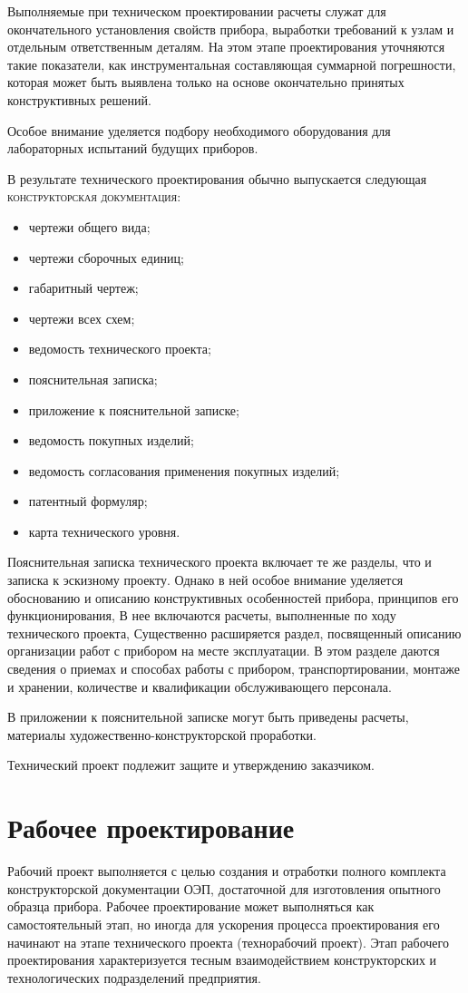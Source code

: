 Выполняемые при техническом проектировании расчеты служат для окончательного установления свойств прибора, выработки требований к узлам и отдельным ответственным деталям. На этом этапе проектирования уточняются такие показатели, как инструментальная составляющая суммарной погрешности, которая может быть выявлена только на основе окончательно принятых конструктивных решений. 

Особое внимание уделяется подбору необходимого оборудования для лабораторных испытаний будущих приборов.

В результате технического проектирования обычно выпускается следующая \textsc{конструкторская документация}: 
\begin{itemize}
	\item чертежи общего вида;
	\item чертежи сборочных единиц;
	\item габаритный чертеж;
	\item чертежи всех схем;
	\item ведомость технического проекта;
	\item пояснительная записка;
	\item приложение к пояснительной записке;
	\item ведомость покупных изделий;
	\item ведомость согласования применения покупных изделий;
	\item патентный формуляр;
	\item карта технического уровня.
\end{itemize}

Пояснительная записка технического проекта включает те же разделы, что и записка к эскизному проекту. Однако в ней особое внимание уделяется обоснованию и описанию конструктивных особенностей прибора, принципов его функционирования, В нее включаются расчеты, выполненные по ходу технического проекта, Существенно расширяется раздел, посвященный описанию организации работ с прибором на месте эксплуатации. В этом разделе даются сведения о приемах и способах работы с прибором, транспортировании, монтаже и хранении, количестве и квалификации обслуживающего персонала.

В приложении к пояснительной записке могут быть приведены расчеты, материалы ху\-до\-жест\-вен\-но-конструкторской проработки.

Технический проект подлежит защите и утверждению заказчиком.

\section{Рабочее проектирование}
Рабочий проект выполняется с целью создания и отработки полного комплекта конструкторской документации ОЭП, достаточной для изготовления опытного образца прибора. Рабочее проектирование может выполняться как самостоятельный этап, но иногда для ускорения процесса проектирования его начинают на этапе технического проекта (технорабочий проект). Этап рабочего проектирования характеризуется тесным взаимодействием конструкторских и технологических подразделений предприятия.


